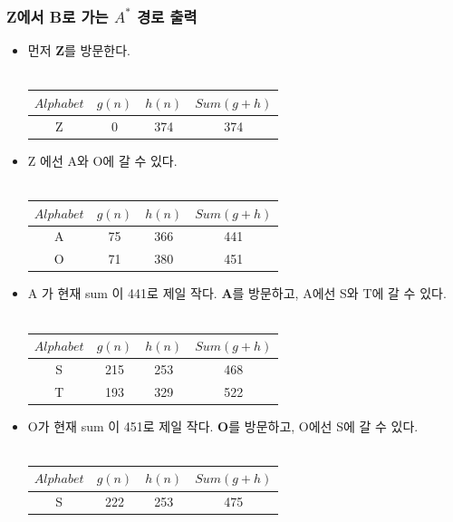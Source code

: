 \documentclass[a4paper]{article}
\begin{document}
\subsubsection{Z에서 B로 가는 $A^{*}$ 경로 출력} %
\begin{itemize}
    \item 먼저 \textbf{Z}를 방문한다. \\~\\
        \begin{tabular}{@{}cccc@{}}
        \toprule
        $Alphabet$ & $g(n)$ & $h(n)$ & $Sum(g+h)$\\ \midrule
        Z & 0 & 374 & 374 \\ 
        \bottomrule 
        \end{tabular}
    \item Z 에선 A와 O에 갈 수 있다. \\~\\
        \begin{tabular}{@{}cccc@{}}
        \toprule
        $Alphabet$ & $g(n)$ & $h(n)$ & $Sum(g+h)$\\ \midrule
        A & 75 & 366 & 441 \\
        O & 71 & 380 & 451 \\
        \bottomrule
        \end{tabular}
    \item A 가 현재 sum 이 441로 제일 작다. \textbf{A}를 방문하고, A에선 S와 T에 갈 수 있다.\\~\\
        \begin{tabular}{@{}cccc@{}}
        \toprule
        $Alphabet$ & $g(n)$ & $h(n)$ & $Sum(g+h)$\\ \midrule
        S & 215 & 253 & 468 \\
        T & 193 & 329 & 522 \\
        \bottomrule
        \end{tabular}
    \item O가 현재 sum 이 451로 제일 작다. \textbf{O}를 방문하고, O에선 S에 갈 수 있다. \\~\\
        \begin{tabular}{@{}cccc@{}}
        \toprule
        $Alphabet$ & $g(n)$ & $h(n)$ & $Sum(g+h)$\\ \midrule
        S & 222 & 253 & 475 \\ 

\end{tabular}
\end{itemize}
\end{document}
